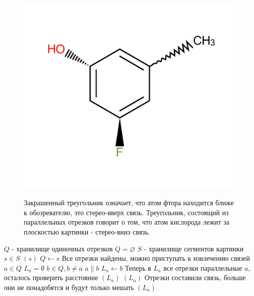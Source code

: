 \begin{figure}
\centering
{\includegraphics[scale=0.4, clip, trim = 15mm 10mm 15mm 10mm]{img/stereo.pdf}}
\caption{Закрашенный треугольник означает, что атом фтора находится ближе к обозревателю, это стерео-вверх связь. 
Треугольник, состоящий из параллельных отрезков говорит о том, что атом кислорода лежит за плоскостью картинки - стерео-вниз связь.}
\end{figure} 

\begin{codebox}
  \li \Comment $Q$ - хранилище одиночных отрезков
  \li $Q = \varnothing$
  \li
  \li \Comment $S$ - хранилище сегментов картинки  
  \li \For $s \in S$ 	
  \li \Do \If {}$(s)$
  \li   	\Then $Q \gets s$
  \li \End \End
  \li \Comment Все отрезки найдены, можно приступать к извлечению связей
  \li \For $a \in Q$
  \li \Do $L_{a} = \emptyset $ 
  \li \For $b \in Q, b \ne a$ 
  \li \Do \If $ a \parallel b $
  \li \Then $L_{a} \gets b$
  \li \End \End 
  \li \Comment Теперь в $L_{a}$ все отрезки параллельные $a$, осталось проверить расстояние
  \li \If {}$(L_{a})$
  \li \Then {}$(L_{a})$
  \li \Comment Отрезки составили связь, больше они не понадобятся и будут только мешать
  \li {}$(L_{a})$
\end{codebox}

